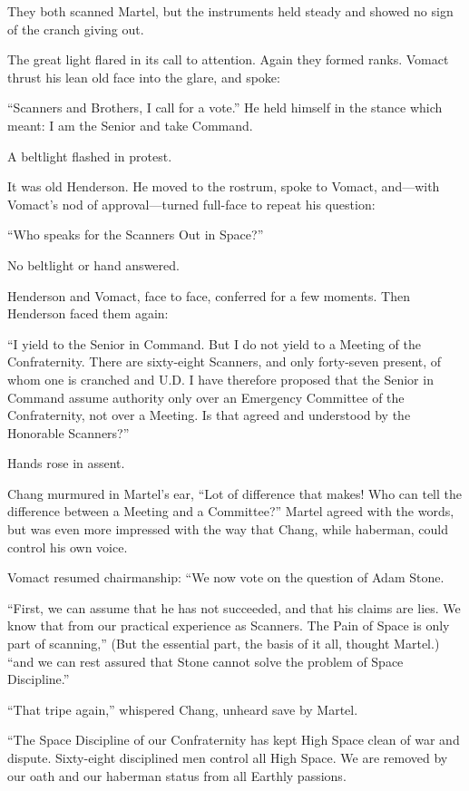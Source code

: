 They both scanned Martel, but the instruments held steady and showed no sign of the cranch giving out.

The great light flared in its call to attention. Again they formed ranks. Vomact thrust his lean old face into the glare, and spoke:

``Scanners and Brothers, I call for a vote.'' He held himself in the stance which meant: I am the Senior and take Command.

A beltlight flashed in protest.

It was old Henderson. He moved to the rostrum, spoke to Vomact, and---with Vomact's nod of approval---turned full-face to repeat his question:

``Who speaks for the Scanners Out in Space?''

No beltlight or hand answered.

Henderson and Vomact, face to face, conferred for a few moments. Then Henderson faced them again:

``I yield to the Senior in Command. But I do not yield to a Meeting of the Confraternity. There are sixty-eight Scanners, and only forty-seven present, of whom one is cranched and U.D. I have therefore proposed that the Senior in Command assume authority only over an Emergency Committee of the Confraternity, not over a Meeting. Is that agreed and understood by the Honorable Scanners?''

Hands rose in assent.

Chang murmured in Martel's ear, ``Lot of difference that makes! Who can tell the difference between a Meeting and a Committee?'' Martel agreed with the words, but was even more impressed with the way that Chang, while haberman, could control his own voice.

Vomact resumed chairmanship: ``We now vote on the question of Adam Stone.

``First, we can assume that he has not succeeded, and that his claims are lies. We know that from our practical experience as Scanners. The Pain of Space is only part of scanning,'' (But the essential part, the basis of it all, thought Martel.) ``and we can rest assured that Stone cannot solve the problem of Space Discipline.''

``That tripe again,'' whispered Chang, unheard save by Martel.

``The Space Discipline of our Confraternity has kept High Space clean of war and dispute. Sixty-eight disciplined men control all High Space. We are removed by our oath and our haberman status from all Earthly passions.

